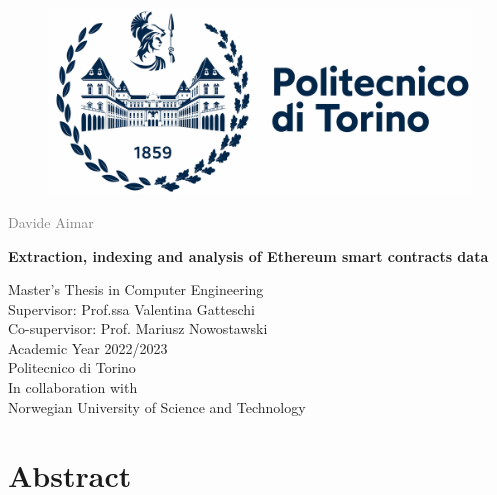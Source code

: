 \documentclass[a4paper, 12pt, openany]{book} %
\newcommand\myemptypage{
    \null
    \thispagestyle{empty}
    \addtocounter{page}{-1}
    \newpage
    } %
\begin{document}
\begin{titlepage}
\vspace*{1cm}

\begin{figure}[h]
    \includegraphics[height=0.32\textwidth]{Figures/logo_polito.jpg}
    \centering
\end{figure}

\vspace*{1.2cm}

\noindent  \textcolor{gray}{\large Davide Aimar} \\
\vspace{0.4cm}

\noindent \textbf{\Large Extraction, indexing and analysis of Ethereum smart contracts data} \\
\vspace{5cm}


\noindent Master's Thesis in Computer Engineering \\
Supervisor: Prof.ssa Valentina Gatteschi \\
Co-supervisor: Prof. Mariusz Nowostawski \\
Academic Year 2022/2023 \\

\vspace{0.2cm}
\noindent Politecnico di Torino \\

\vspace{0.2cm}
\noindent In collaboration with\\
Norwegian University of Science and Technology

\end{titlepage}

\restoregeometry
\myemptypage %


\chapter*{Abstract} %
\setcounter{page}{1}
\end{document}
